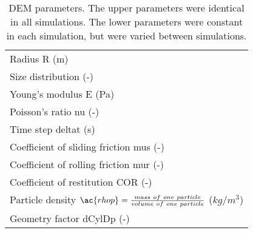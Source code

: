 \begin{table}[h]
\centering
\begin{tabular}{l}
\hline 
    Radius \ac{R} (m)   \\ [5pt]

	Size distribution (-) \\ [5pt]

    Young's modulus \ac{E} (Pa)  \\ [5pt]

    Poisson's ratio \ac{nu} (-) \\ 
     Time step \ac{deltat} (s) \\ [5pt]
        \hline
     Coefficient of sliding friction \ac{mus} (-)\\  [5pt]
    Coefficient of rolling friction \ac{mur} (-) \\ [5pt]
    Coefficient of restitution \ac{COR} (-)   \\ [5pt]
     Particle density $\ac{rhop} = \frac{mass ~ of ~ one ~ particle}{volume ~ of
     ~ one ~ particle}$ ($kg/m^3$)  \\ [5pt]
     Geometry factor \ac{dCylDp} (-)  \\ [5pt]
   
\hline
\end{tabular}
\caption[DEM parameters]{DEM parameters. The upper parameters were
identical in all simulations. The lower parameters were constant in each
simulation, but were varied between simulations.}
\label{tab:08DEMparameters}
\end{table}


